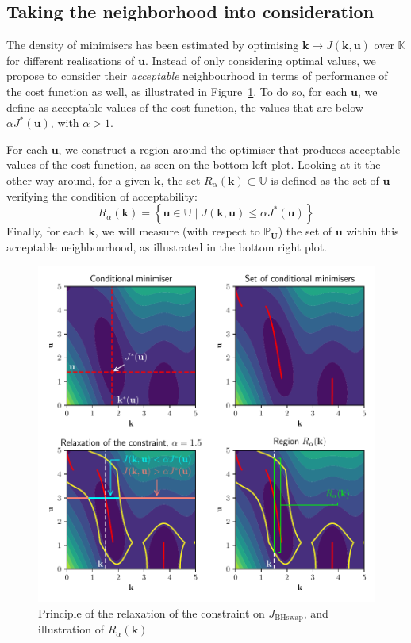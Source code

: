 \documentclass[preprint, 1p]{elsarticle}
\newcommand{\Prob}{\mathbb{P}}
\newcommand{\Kspace}{\mathbb{K}}
\newcommand{\Uspace}{\mathbb{U}}
\begin{document}
\subsection{Taking the neighborhood into consideration}
The density of minimisers has been estimated by optimising $\mathbf{k}\mapsto J(\mathbf{k},\mathbf{u})$ over $\Kspace$ for different realisations of $\mathbf{u}$. Instead of only considering  optimal values, we propose to consider their {\it acceptable} neighbourhood in terms of performance of the cost function as well, as illustrated in Figure~\ref{fig:relax_tuto}. 
To do so, for each $\mathbf{u}$, we define as acceptable values of the cost function, the values that are below $\alpha J^*(\mathbf{u})$, with $\alpha > 1$. 

For each $\mathbf{u}$, we construct a region around the optimiser that produces acceptable values of the cost function, as seen on the bottom left plot. Looking at it the other way around, for a given $\mathbf{k}$, the set $R_{\alpha}(\mathbf{k}) \subset \Uspace$ is defined as the set of $\mathbf{u}$ verifying the condition of acceptability:
\begin{equation}
\label{eq:def_Ralpha}
R_{\alpha}(\mathbf{k}) = \left\{ \mathbf{u} \in \Uspace \mid J(\mathbf{k},\mathbf{u}) \leq \alpha J^*(\mathbf{u}) \right\}
\end{equation}
Finally, for each $\mathbf{k}$, we will measure (with respect to $\Prob_{\mathbf{U}}$) the set of $\mathbf{u}$ within this acceptable neighbourhood, as illustrated in the bottom right plot. 

\begin{figure}[!t]
\centering
\includegraphics[width=12cm]{Figures/relaxation_tuto.pdf}
\caption{Principle of the relaxation of the constraint on $J_{\mathrm{BHswap}}$, and illustration of $R_\alpha(\mathbf{k})$}
\label{fig:relax_tuto}
\end{figure}
\end{document}
